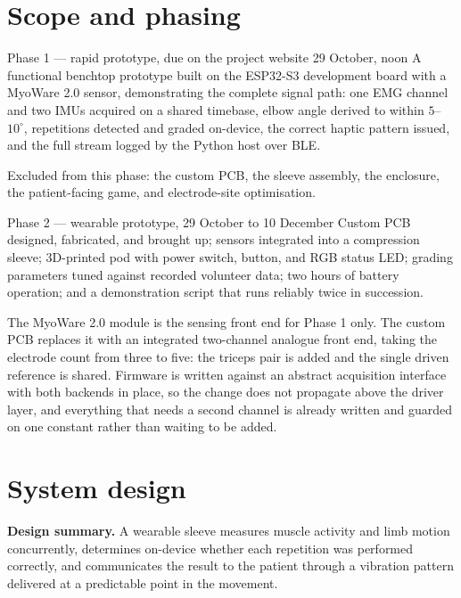 \documentclass[11pt]{article}
\begin{document}
\section{Scope and phasing}

\begin{phasebox}{Phase 1 — rapid prototype, due on the project website 29 October, noon}
A functional benchtop prototype built on the ESP32-S3 development board with a
MyoWare 2.0 sensor, demonstrating the complete signal path: one EMG channel and
two IMUs acquired on a shared timebase, elbow angle derived to within
$5$--$10^{\circ}$, repetitions detected and graded on-device, the correct haptic
pattern issued, and the full stream logged by the Python host over BLE.

\smallskip
Excluded from this phase: the custom PCB, the sleeve assembly, the enclosure,
the patient-facing game, and electrode-site optimisation.
\end{phasebox}

\begin{phasebox}{Phase 2 — wearable prototype, 29 October to 10 December}
Custom PCB designed, fabricated, and brought up; sensors integrated into a
compression sleeve; 3D-printed pod with power switch, button, and RGB status
LED; grading parameters tuned against recorded volunteer data; two hours of
battery operation; and a demonstration script that runs reliably twice in
succession.
\end{phasebox}

\noindent
The MyoWare 2.0 module is the sensing front end for Phase 1 only. The custom PCB
replaces it with an integrated two-channel analogue front end, taking the
electrode count from three to five: the triceps pair is added and the single
driven reference is shared. Firmware is written against an abstract acquisition
interface with both backends in place, so the change does not propagate above
the driver layer, and everything that needs a second channel is already written
and guarded on one constant rather than waiting to be added.

\section{System design}

\begin{callout}
\textbf{Design summary.} A wearable sleeve measures muscle activity and limb
motion concurrently, determines on-device whether each repetition was performed
correctly, and communicates the result to the patient through a vibration
pattern delivered at a predictable point in the movement.
\end{callout}
\end{document}
